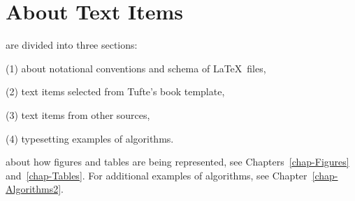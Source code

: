 \chapter{About Text Items}
\label{chap-About}
 are divided into three sections:

(1) about notational conventions and schema of \LaTeX~files,

(2) text items selected from Tufte's book template,

(3) text items from other sources,

(4) typesetting examples of algorithms.

 about how figures and tables are being represented,
see Chapters~\ref{chap-Figures} and~\ref{chap-Tables}.
For additional examples of algorithms, see Chapter~\ref{chap-Algorithms2}.

\clearpage

\clearpage

\clearpage

\clearpage
